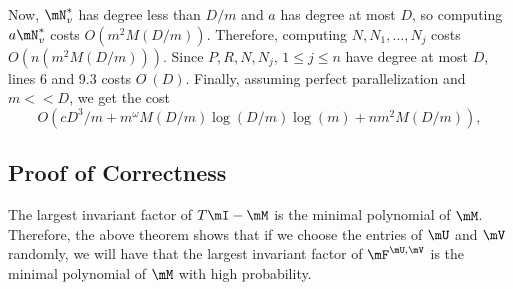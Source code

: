 \documentclass[12pt]{article}
\newcommand{\mat}[1]{\bm{\MakeUppercase{#1}}} %
\newcommand{\todo}[1]{\textcolor{red}{{\bf todo:} #1}}
\begin{document}
Now, $\mN_v^*$ has degree less than $D/m$ and $a$ has degree at most $D$, so
computing $a \mN_v^*$ costs $O(m^2M(D/m))$. Therefore, computing $N,N_1,\dots,N_j$ costs $O(n(m^2M(D/m)))$.
Since $P,R,N,N_j$, $1\le j \le n$
have degree at most $D$, lines 6 and 9.3 costs $O^{\tilde{~}}(D)$.
Finally, assuming perfect parallelization and $m << D$, we get the cost 
$$O(cD^3/m + m^{\omega} M(D/m) \log(D/m) \log(m) + nm^2M(D/m)),$$




\subsection{Proof of Correctness}


The largest invariant factor of $T\mI - \mM$ is the minimal polynomial
of $\mM$. Therefore, the above theorem shows that if we choose the
entries of $\mU$ and $\mV$ randomly, we will have that the largest
invariant factor of $\mF^{\mU,\mV}$ is the minimal polynomial of $\mM $
with high probability.



\end{document}

